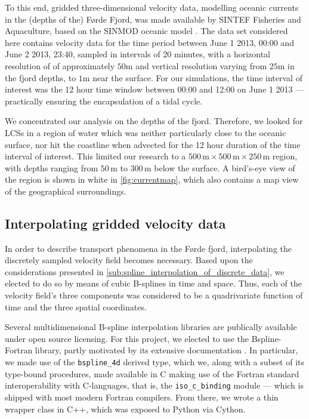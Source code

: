 To this end, gridded three-dimensional velocity data, modelling oceanic
currents in the (depths of the) Førde Fjord, was made available by SINTEF
Fisheries and Aquaculture, based on the SINMOD oceanic model
\parencite{slagstad2005modeling}. The data set considered here contains velocity
data for the time period between June 1 2013, 00:00 and June 2 2013, 23:40,
sampled in intervals of 20 minutes, with a horizontal resolution of
of approximately $50\si{\meter}$ and vertical resolution varying from
$25\si{\meter}$ in the fjord depths, to $1\si{\meter}$ near the surface. For our
simulations, the time interval of interest was the 12 hour time window between
00:00 and 12:00 on June 1 2013 --- practically ensuring the encapsulation of a
tidal cycle.

We concentrated our analysis on the depths of the fjord. Therefore, we looked
for LCSs in a region of water which was neither particularly close to the
oceanic surface, nor hit the coastline when advected for the 12 hour duration
of the time interval of interest. This limited our research to a
$500\,\si{\meter}\times500\,\si{\meter}\times250\,\si{\meter}$ region, with
depths ranging from $50\,\si{\meter}$ to $300\,\si{\meter}$ below the
surface. A bird's-eye view of the region is shown in white in
\cref{fig:currentmap}, which also contains a map view of the geographical
surroundings.



\subsection{Interpolating gridded velocity data}
\label{sub:interpolating_gridded_velocity_data}

In order to describe transport phenomena in the Førde fjord, interpolating
the discretely sampled velocity field becomes necessary. Based upon the
considerations presented in \cref{sub:spline_interpolation_of_discrete_data},
we elected to do so by means of cubic B-splines in time and space. Thus,
each of the velocity field's three components was considered to be a
quadrivariate function of time and the three spatial coordinates.

Several multidimensional B-spline interpolation libraries are publically
available under open source licensing. For this project, we elected to use
the Bspline-Fortran library, partly motivated by its extensive documentation
\parencite{williams2018bspline}. In particular, we made use of the
\texttt{bspline\_4d} derived type, which we, along with a subset of its
type-bound procedures, made available in C making use of the Fortran standard
interoperability with C-languages, that is, the \texttt{iso\_c\_binding} module
--- which is shipped with most modern Fortran compilers. From there, we wrote a
thin wrapper class in C++, which was exposed to Python via Cython.

